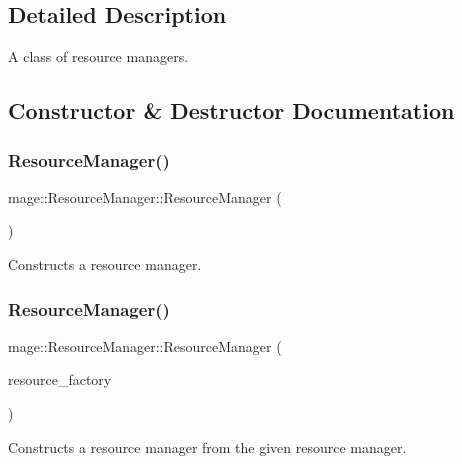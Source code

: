 \subsection{Detailed Description}
A class of resource managers. 

\subsection{Constructor \& Destructor Documentation}
\hypertarget{classmage_1_1_resource_manager_a0ff509899a9fbef2096c60b3d3d80bd5}{}\label{classmage_1_1_resource_manager_a0ff509899a9fbef2096c60b3d3d80bd5} 
\subsubsection{\texorpdfstring{Resource\+Manager()}{ResourceManager()}\hspace{0.1cm}{\footnotesize\ttfamily [1/3]}}
{\footnotesize\ttfamily mage\+::\+Resource\+Manager\+::\+Resource\+Manager (\begin{DoxyParamCaption}{ }\end{DoxyParamCaption})}

Constructs a resource manager. \hypertarget{classmage_1_1_resource_manager_a7d61b10f18bb0ea34bc2a1e9920eeb3d}{}\label{classmage_1_1_resource_manager_a7d61b10f18bb0ea34bc2a1e9920eeb3d} 
\subsubsection{\texorpdfstring{Resource\+Manager()}{ResourceManager()}\hspace{0.1cm}{\footnotesize\ttfamily [2/3]}}
{\footnotesize\ttfamily mage\+::\+Resource\+Manager\+::\+Resource\+Manager (\begin{DoxyParamCaption}\item[{const \hyperlink{classmage_1_1_resource_manager}{Resource\+Manager} \&}]{resource\+\_\+factory }\end{DoxyParamCaption})\hspace{0.3cm}{\ttfamily [delete]}}

Constructs a resource manager from the given resource manager.


